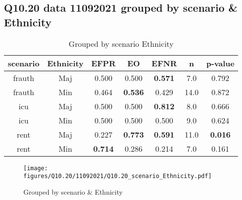 \subsection{Q10.20 data 11092021 grouped by scenario \& Ethnicity}

\begin{comment}
                   EFPR        EO      EFNR     n    pvalue
(frauth, Maj)  0.500000  0.500000  0.571429   7.0  0.791676
(frauth, Min)  0.464286  0.535714  0.428571  14.0  0.871600
(icu, Maj)     0.500000  0.500000  0.812500   8.0  0.666228
(icu, Min)     0.500000  0.500000  0.500000   9.0  0.623772
(rent, Maj)    0.227273  0.772727  0.590909  11.0  0.015680
(rent, Min)    0.714286  0.285714  0.214286   7.0  0.160530
\end{comment}

\begin{table}[h]
    \centering
    \begin{tabular}{|c|c|c|c|c|c|c|}
        \hline
        scenario & Ethnicity & EFPR & EO & EFNR & n & p-value\\
        \hline
        frauth & Maj & 0.500 & 0.500 & \textbf{0.571} & 7.0 & 0.792\\
		frauth & Min & 0.464 & \textbf{0.536} & 0.429 & 14.0 & 0.872\\
		icu & Maj & 0.500 & 0.500 & \textbf{0.812} & 8.0 & 0.666\\
		icu & Min & 0.500 & 0.500 & 0.500 & 9.0 & 0.624\\
		rent & Maj & 0.227 & \textbf{0.773} & \textbf{0.591} & 11.0 & \textbf{0.016}\\
		rent & Min & \textbf{0.714} & 0.286 & 0.214 & 7.0 & 0.161\\
		
        \hline
    \end{tabular}
    \caption{Grouped by scenario Ethnicity}
    \label{tab:my_label}
\end{table}
\begin{figure}[h]
    \centering
    \texttt{[image: figures/Q10.20/11092021/Q10.20\_scenario\_Ethnicity.pdf]}
    \caption{Grouped by scenario \& Ethnicity}
    \label{fig:my_label}
\end{figure}
